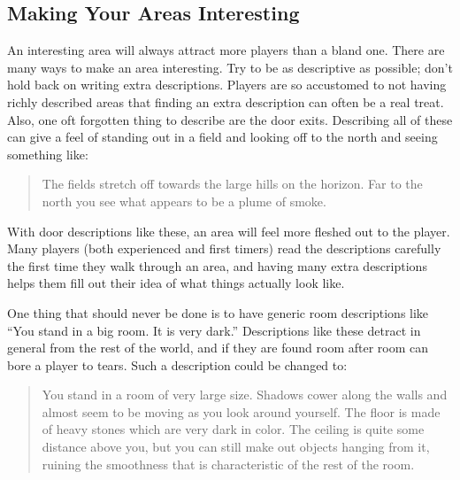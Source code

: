 \documentclass[11pt]{article}
\begin{document}
\subsection{Making Your Areas Interesting}
An interesting area will always attract more players than a bland one.  There are many ways to make an area interesting.  Try to be as descriptive as possible; don't hold back on writing extra descriptions.  Players are so accustomed to not having richly described areas that finding an extra description can often be a real treat.  Also, one oft forgotten thing to describe are the door exits.  Describing all of these can give a feel of standing out in a field and looking off to the north and seeing something like: 

\begin{quote}
The fields stretch off towards the large hills on the horizon.  Far to the north you see what appears to be a plume of smoke.
\end{quote}

With door descriptions like these, an area will feel more fleshed out to the player.  Many players (both experienced and first timers) read the descriptions carefully the first time they walk through an area, and having many extra descriptions helps them fill out their idea of what things actually look like. 
\par
One thing that should never be done is to have generic room descriptions like ``You stand in a big room.  It is very dark.'' Descriptions like these detract in general from the rest of the world, and
if they are found room after room can bore a player to tears.  Such a
description could be changed to: 

\begin{quote}
You stand in a room of very large size.  Shadows cower along the walls and almost seem to be moving as you look around yourself.  The floor is made of heavy stones which are very dark in color.  The ceiling is quite some distance above you, but you can still make out objects hanging from it, ruining the smoothness that is characteristic of the rest of the room.
\end{quote}
\end{document}
